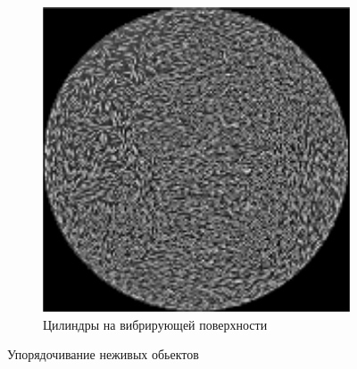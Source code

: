 \begin{figure}
\begin{subfigure}{.4\columnwidth}
                \includegraphics[width=\columnwidth]{Images/Fig6_CollectiveMotion}
                \caption{Цилиндры на вибрирующей поверхности}
                \label{fig:CollMot:rods}
        \end{subfigure}
        \caption{Упорядочивание неживых обьектов}
        \label{fig:CollMot:NonLiving}
    \end{figure}
